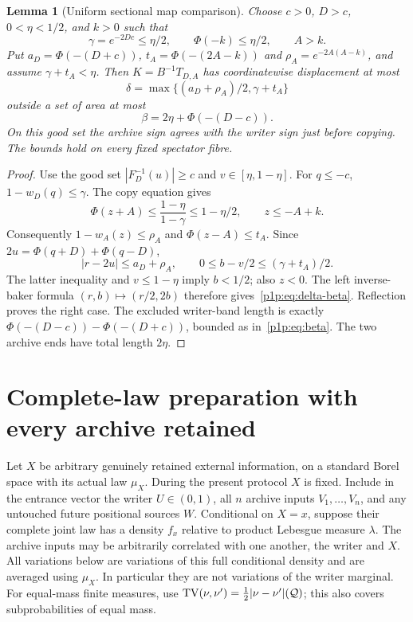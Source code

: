 \documentclass[11pt]{article}
\numberwithin{equation}{section}
\newtheorem{lemma}[theorem]{Lemma}
\theoremstyle{definition}
\theoremstyle{remark}
\begin{document}
\begin{lemma}[Uniform sectional map comparison]\label{p1p:lem:separation}
Choose $c>0$, $D>c$, $0<\eta<1/2$, and $k>0$ such that
\[
 \gamma=e^{-2Dc}\leq\eta/2,\qquad \Phi(-k)\leq\eta/2,
 \qquad A>k.
\]
Put $a_D=\Phi(-(D+c))$, $t_A=\Phi(-(2A-k))$ and
$\rho_A=e^{-2A(A-k)}$, and assume $\gamma+t_A<\eta$.
Then $K=B^{-1}T_{D,A}$ has coordinatewise displacement at most
\begin{equation}\label{p1p:eq:delta-beta}
 \delta=\max\{(a_D+\rho_A)/2,\gamma+t_A\}
\end{equation}
outside a set of area at most
\begin{equation}\label{p1p:eq:beta}
 \beta=2\eta+\Phi(-(D-c)).
\end{equation}
On this good set the archive sign agrees with the writer sign just
before copying. The bounds hold on every fixed spectator fibre.
\end{lemma}
\begin{proof}
Use the good set $|F_D^{-1}(u)|\geq c$ and
$v\in[\eta,1-\eta]$. For $q\leq-c$, $1-w_D(q)\leq\gamma$.
The copy equation gives
\[
 \Phi(z+A)\leq\frac{1-\eta}{1-\gamma}\leq1-\eta/2,
 \qquad z\leq-A+k.
\]
Consequently $1-w_A(z)\leq\rho_A$ and $\Phi(z-A)\leq t_A$.
Since $2u=\Phi(q+D)+\Phi(q-D)$,
\[
 |r-2u|\leq a_D+\rho_A,
 \qquad 0\leq b-v/2\leq(\gamma+t_A)/2.
\]
The latter inequality and $v\leq1-\eta$ imply $b<1/2$;
also $z<0$. The left inverse-baker formula $(r,b)\mapsto(r/2,2b)$
therefore gives~\eqref{p1p:eq:delta-beta}. Reflection proves the right
case. The excluded writer-band length is exactly
$\Phi(-(D-c))-\Phi(-(D+c))$, bounded as in~\eqref{p1p:eq:beta}.
The two archive ends have total length $2\eta$.
\end{proof}

\section{Complete-law preparation with every archive retained}
\label{p1p:sec:preparation}

Let $X$ be arbitrary genuinely retained external information, on a
standard Borel space with its actual law $\mu_X$. During the present
protocol $X$ is fixed. Include in the entrance vector the writer
$U\in(0,1)$, all $n$ archive inputs $V_1,\ldots,V_n$, and any untouched
future positional sources $W$. Conditional on $X=x$, suppose their
complete joint law has a density $f_x$ relative to product Lebesgue
measure $\lambda$. The archive inputs may be arbitrarily correlated
with one another, the writer and $X$. All variations below are variations
of this full conditional density and are averaged using $\mu_X$.
In particular they are not variations of the writer marginal.
For equal-mass finite measures, use
$\operatorname{TV}(\nu,\nu')=\frac12|\nu-\nu'|(\mathcal Q)$; this also covers
subprobabilities of equal mass.
\end{document}
